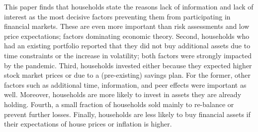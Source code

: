 \documentclass[ProjectABM]{subfiles}
\begin{document}
This paper finds that households state the reasons lack of information and lack of interest as the most decisive factors preventing them from participating in financial markets. These are even more important than risk assessments and low price expectations; factors dominating economic theory. %
Second, households who had an existing portfolio reported that they did not buy additional assets due to time constraints or the increase in volatility; both factors were strongly impacted by the pandemic. Third, households invested either because they expected higher stock market prices or due to a (pre-existing) savings plan. For the former, other factors such as additional time, information, and peer effects were important as well. Moreover, households are more likely to invest in assets they are already holding. Fourth, a small fraction of households sold mainly to re-balance or prevent further losses. Finally, households are less likely to buy financial assets if their expectations of house prices or inflation is higher. %
\end{document}
